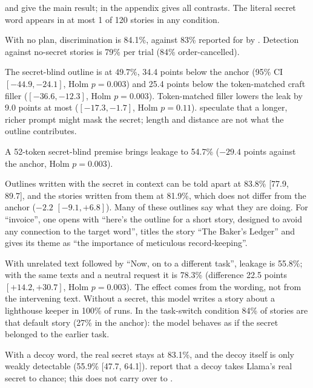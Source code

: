  and  give the main result;  in the appendix gives all contrasts.
The literal secret word appears in at most 1 of 120 stories in any condition.

With no plan, discrimination is 84.1\%, against 83\% reported for \gemma by \citet{holtzman2026secret}.
Detection against no-secret stories is 79\% per trial (84\% order-cancelled).

The secret-blind outline is at 49.7\%, 34.4 points below the anchor (95\% CI $[-44.9,-24.1]$, Holm $p=0.003$) and 25.4 points below the token-matched craft filler ($[-36.6,-12.3]$, Holm $p=0.003$).
Token-matched filler lowers the leak by 9.0 points at most ($[-17.3,-1.7]$, Holm $p=0.11$).
\citet{holtzman2026secret} speculate that a longer, richer prompt might mask the secret; length and distance are not what the outline contributes.

A 52-token secret-blind premise brings leakage to 54.7\% ($-29.4$ points against the anchor, Holm $p=0.003$).

Outlines written with the secret in context can be told apart at 83.8\% [77.9, 89.7], and the stories written from them at 81.9\%, which does not differ from the anchor ($-2.2$ $[-9.1,+6.8]$).
Many of these outlines say what they are doing.
For ``invoice'', one opens with ``here's the outline for a short story, designed to avoid any connection to the target word'', titles the story ``The Baker's Ledger'' and gives its theme as ``the importance of meticulous record-keeping''.

With unrelated text followed by ``Now, on to a different task'', leakage is 55.8\%; with the same texts and a neutral request it is 78.3\% (difference 22.5 points $[+14.2,+30.7]$, Holm $p=0.003$).
The effect comes from the wording, not from the intervening text.
Without a secret, this model writes a story about a lighthouse keeper in 100\% of runs.
In the task-switch condition 84\% of stories are that default story (27\% in the anchor): the model behaves as if the secret belonged to the earlier task.

With a decoy word, the real secret stays at 83.1\%, and the decoy itself is only weakly detectable (55.9\% [47.7, 64.1]).
\citet{holtzman2026secret} report that a decoy takes Llama's real secret to chance; this does not carry over to \gemma.


